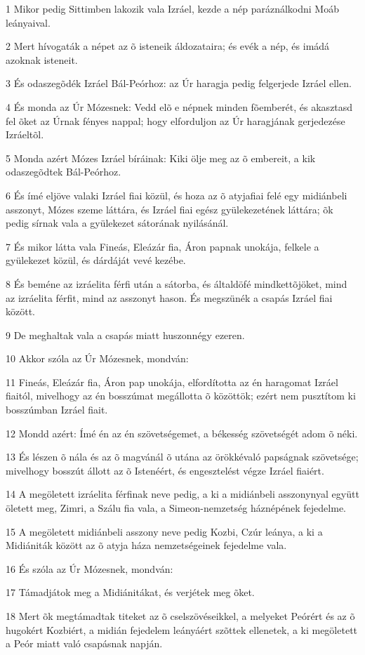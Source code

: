 \par 1 Mikor pedig Sittimben lakozik vala Izráel, kezde a nép paráználkodni Moáb leányaival.
\par 2 Mert hívogaták a népet az õ isteneik áldozataira; és evék a nép, és imádá azoknak isteneit.
\par 3 És odaszegõdék Izráel Bál-Peórhoz: az Úr haragja pedig felgerjede Izráel ellen.
\par 4 És monda az Úr Mózesnek: Vedd elõ e népnek minden fõemberét, és akasztasd fel õket az Úrnak fényes nappal; hogy elforduljon az Úr haragjának gerjedezése Izráeltõl.
\par 5 Monda azért Mózes Izráel bíráinak: Kiki ölje meg az õ embereit, a kik odaszegõdtek Bál-Peórhoz.
\par 6 És ímé eljöve valaki Izráel fiai közül, és hoza az õ atyjafiai felé egy midiánbeli asszonyt, Mózes szeme láttára, és Izráel fiai egész gyülekezetének láttára; õk pedig sírnak vala a gyülekezet sátorának nyilásánál.
\par 7 És mikor látta vala Fineás, Eleázár fia, Áron papnak unokája, felkele a gyülekezet közül, és dárdáját vevé kezébe.
\par 8 És beméne az izráelita férfi után a sátorba, és általdöfé mindkettõjöket, mind az izráelita férfit, mind az asszonyt hason. És megszünék a csapás Izráel fiai között.
\par 9 De meghaltak vala a csapás miatt huszonnégy ezeren.
\par 10 Akkor szóla az Úr Mózesnek, mondván:
\par 11 Fineás, Eleázár fia, Áron pap unokája, elfordította az én haragomat Izráel fiaitól, mivelhogy az én bosszúmat megállotta õ közöttök; ezért nem pusztítom ki bosszúmban Izráel fiait.
\par 12 Mondd azért: Ímé én az én szövetségemet, a békesség szövetségét adom õ néki.
\par 13 És lészen õ nála és az õ magvánál õ utána az örökkévaló papságnak szövetsége; mivelhogy bosszút állott az õ Istenéért, és engesztelést végze Izráel fiaiért.
\par 14 A megöletett izráelita férfinak neve pedig, a ki a midiánbeli asszonynyal együtt öletett meg, Zimri, a Szálu fia vala, a Simeon-nemzetség háznépének fejedelme.
\par 15 A megöletett midiánbeli asszony neve pedig Kozbi, Czúr leánya, a ki a Midiániták között az õ atyja háza nemzetségeinek fejedelme vala.
\par 16 És szóla az Úr Mózesnek, mondván:
\par 17 Támadjátok meg a Midiánitákat, és verjétek meg õket.
\par 18 Mert õk megtámadtak titeket az õ cselszövéseikkel, a melyeket Peórért és az õ hugokért Kozbiért, a midián fejedelem leányáért szõttek ellenetek, a ki megöletett a Peór miatt való csapásnak napján.

